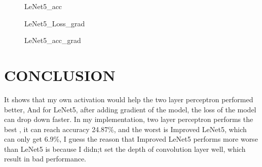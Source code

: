 \documentclass[conference]{IEEEtran}
\begin{document}
    \begin{figure}[htb]
        \centering
        \renewcommand{\figurename}{Figure}
        \caption{LeNet5\_acc}
        \label{fig:acc}
    \end{figure}

    \begin{figure}[htb]
        \centering
        \renewcommand{\figurename}{Figure}
            
        \caption{LeNet5\_Loss\_grad}
        \label{fig:loss_grad}
    \end{figure}

    \begin{figure}[htb]
        \centering
        \renewcommand{\figurename}{Figure}
        \caption{LeNet5\_acc\_grad}
        \label{fig:acc_grad}
    \end{figure}



        
        
\section{CONCLUSION}
It shows that my own activation would help the two layer perceptron performed better, And for LeNet5, after adding gradient of the model, the loss of the model can drop down faster.
\indent In my implementation, two layer perceptron performs the best , it can reach accuracy 24.87\%, and the worst is Improved LeNet5, which can only get 6.9\%, I guess the reason that Improved LeNet5 performs more worse than LeNet5 is because I didn;t set the depth of convolution layer well, which result in bad performance.
\end{document}
